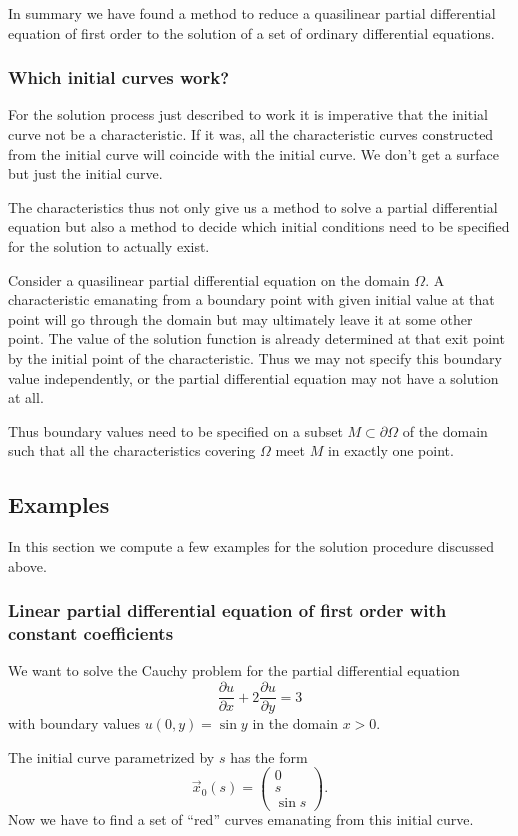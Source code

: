 In summary we have found a method to reduce a quasilinear partial differential
equation of first order to the solution of a set of ordinary differential
equations.

\subsubsection{Which initial curves work?}
For the solution process just described to work it is imperative that
the initial curve not be a characteristic.
If it was, all the characteristic curves constructed from the initial
curve will coincide with the initial curve.
We don't get a surface but just the initial curve.

The characteristics thus not only give us a method to solve a partial
differential equation but also a method to decide which initial
conditions need to be specified for the solution to actually exist.

Consider a quasilinear partial differential equation on the domain
$\Omega$.
A characteristic emanating from a boundary point with given initial
value at that point will go through the domain but may ultimately
leave it at some other point.
The value of the solution function is already determined at that exit
point by the initial point of the characteristic.
Thus we may not specify this boundary value independently, or the
partial differential equation may not have a solution at all.

Thus boundary values need to be specified on a subset
$M\subset\partial \Omega$ of the domain such that all the
characteristics covering $\Omega$ meet $M$ in exactly one point.

\subsection{Examples}
In this section we compute a few examples for the solution procedure
discussed above.

\subsubsection{Linear partial differential equation of first order with constant coefficients
\label{konstantekoeff}}
We want to solve the Cauchy problem for the partial differential equation
\[
\frac{\partial u}{\partial x}+2\frac{\partial u}{\partial y}=3
\]
with boundary values $u(0,y)=\sin y$ in the domain $x>0$.

The initial curve parametrized by $s$ has the form
\[
\vec x_0(s)
=
\begin{pmatrix}
0\\s\\\sin s
\end{pmatrix}.
\]
Now we have to find a set of ``red'' curves emanating from this 
initial curve.


